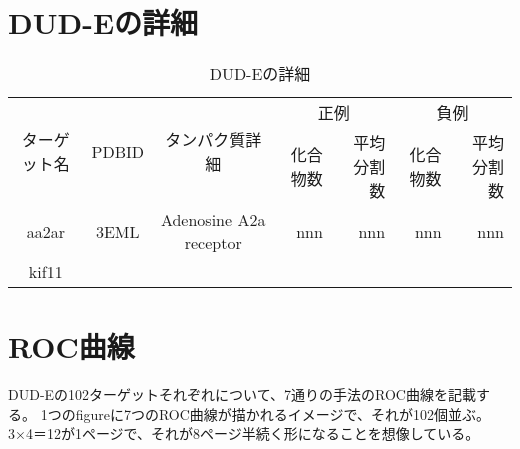 \appendix
\chapter{DUD-Eの詳細}\label{appendix:dude}
\begin{table}[htb] \centering
	\caption{DUD-Eの詳細}
	\label{tb:dude_description}
	\begin{tabular}{c|c|c|rr|rr|}
	\multirow{2}{*}{ターゲット名}	&\multirow{2}{*}{PDBID}	&\multirow{2}{*}{タンパク質詳細}	&\multicolumn{2}{c|}{正例}	&\multicolumn{2}{c|}{負例}	\\
							&					&							&化合物数	&平均分割数	&化合物数	&平均分割数	\\ \hline
	aa2ar					&3EML				&Adenosine A2a receptor		&nnn		&nnn		&nnn		&nnn		\\
	kif11						&					&							&			&			&			&			\\ \hline
	\end{tabular}
\end{table}

\chapter{ROC曲線}\label{appendix:roc}
DUD-Eの102ターゲットそれぞれについて、7通りの手法のROC曲線を記載する。
1つのfigureに7つのROC曲線が描かれるイメージで、それが102個並ぶ。
3×4＝12が1ページで、それが8ページ半続く形になることを想像している。